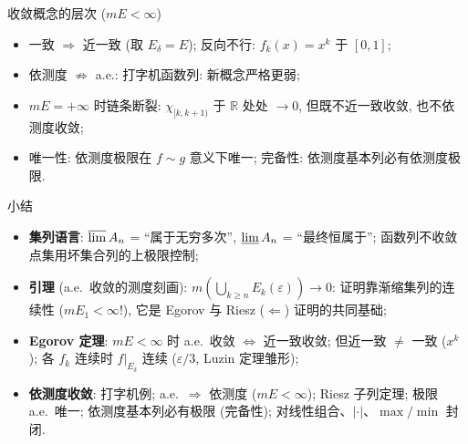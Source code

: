 


\begin{frame}{收敛概念的层次 ($mE < \infty$)}

\begin{center}
\end{center}

\pause

\begin{itemize}
\item 一致 $\Longrightarrow$ 近一致 (取 $E_\delta = E$); 反向不行: $f_k(x) = x^k$ 于 $[0,1]$;
\item 依测度 $\not\Longrightarrow$ a.e.: 打字机函数列: 新概念\alert{严格更弱};
\item $mE = +\infty$ 时链条断裂: $\chi_{[k, k+1)}$ 于 $\mathbb{R}$ 处处 $\to 0$, 但既不近一致收敛, 也不依测度收敛;
\item 唯一性: 依测度极限在 $f \sim g$ 意义下唯一; 完备性: 依测度基本列必有依测度极限.
\end{itemize}

\end{frame}


\begin{frame}{小结}

\begin{itemize}
\item \textbf{集列语言}: $\varlimsup A_n$ = ``属于无穷多次'', $\varliminf A_n$ = ``最终恒属于''; 函数列不收敛点集用坏集合列的上极限控制;
\pause
\item \textbf{引理} (a.e.\ 收敛的测度刻画): $m(\bigcup_{k \geqslant n} E_k(\varepsilon)) \to 0$: 证明靠\alert{渐缩集列}的连续性 ($mE_1 < \infty$!), 它是 Egorov 与 Riesz ($\Longleftarrow$) 证明的共同基础;
\pause
\item \textbf{Egorov 定理}: $mE < \infty$ 时 a.e.\ 收敛 $\iff$ 近一致收敛; 但近一致 $\neq$ 一致 ($x^k$); \alert{各 $f_k$ 连续时 $f\big|_{E_\delta}$ 连续} ($\varepsilon/3$, Luzin 定理雏形);
\pause
\item \textbf{依测度收敛}: 打字机例; a.e.\ $\Longrightarrow$ 依测度 ($mE < \infty$); Riesz 子列定理; 极限 a.e.\ 唯一; 依测度基本列必有极限 (\alert{完备性}); 对线性组合、$|\cdot|$、$\max/\min$ 封闭.
\end{itemize}

\end{frame}

